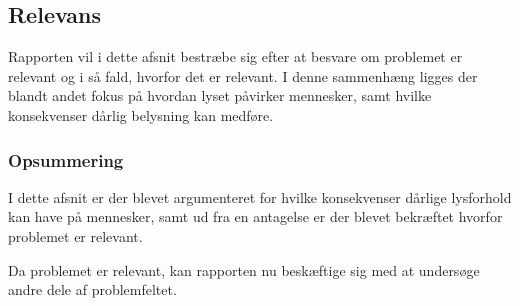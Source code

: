\subsection{Relevans}
Rapporten vil i dette afsnit bestræbe sig efter at besvare om problemet er relevant og i så fald, hvorfor det er relevant. I denne sammenhæng ligges der blandt andet fokus på hvordan lyset påvirker mennesker, samt hvilke konsekvenser dårlig belysning kan medføre. 







\subsubsection*{Opsummering}
I dette afsnit er der blevet argumenteret for hvilke konsekvenser dårlige lysforhold kan have på mennesker, samt ud fra en antagelse er der blevet bekræftet hvorfor problemet er relevant. 

Da problemet er relevant, kan rapporten nu beskæftige sig med at undersøge andre dele af problemfeltet. 
